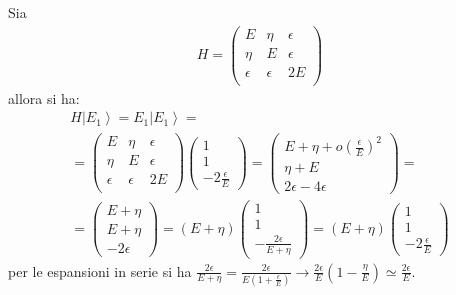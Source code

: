 Sia
\begin{equation}\begin{split}
H=\left(\begin{matrix}
E&\eta&\epsilon\\
\eta&E&\epsilon\\
\epsilon&\epsilon&2E\\
\end{matrix}\right)
\end{split}\end{equation}
allora si ha:
\begin{equation}\begin{split}
H\left |E_1 \right\rangle=E_1\left |E_1 \right\rangle=\\
=\left(\begin{matrix}
E&\eta&\epsilon\\
\eta&E&\epsilon\\
\epsilon&\epsilon&2E\\
\end{matrix}\right)
\left(\begin{matrix}
1\\1\\-2\frac{\epsilon}{E}
\end{matrix}\right)=\left(\begin{matrix}
E+\eta+o\left(\frac{\epsilon}{E}\right)^2\\
\eta+E\\
2\epsilon-4\epsilon
\end{matrix}\right)=\\
=\left(\begin{matrix}
E+\eta\\E+\eta\\-2\epsilon
\end{matrix}\right)=\left(E+\eta\right)\left(\begin{matrix}
1\\1\\-\frac{2\epsilon}{E+\eta}
\end{matrix}\right)=\left(E+\eta\right)\left(\begin{matrix}
1\\1\\-2\frac{\epsilon}{E}
\end{matrix}\right)
\end{split}\end{equation}
per le espansioni in serie si ha $\frac{2\epsilon}{E+\eta}=\frac{2\epsilon}{E\left(1+\frac{\epsilon}{E}\right)}\rightarrow \frac{2\epsilon}{E}\left(1-\frac{\eta}{E}\right)\simeq \frac{2\epsilon}{E}$.


